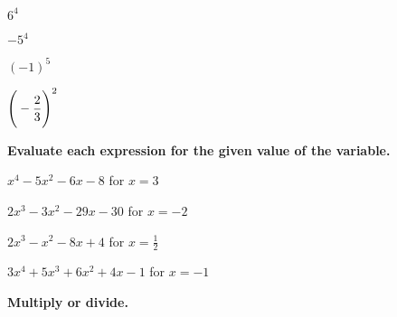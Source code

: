 \documentclass{report}
\theoremstyle{definition}
\begin{document}
\begin{enumerate}
\setcounter{enumi}{5}
	\begin{minipage}[t]{0.225\linewidth}
	\item $6^4$
	\end{minipage}
	\begin{minipage}[t]{0.225\linewidth}
	\item $-5^4$
	\end{minipage}
	\begin{minipage}[t]{0.225\linewidth}
	\item $(-1)^5$
	\end{minipage}
	\begin{minipage}[t]{0.225\linewidth}
	\item $\displaystyle\Bigg{(}-\frac{2}{3}\Bigg{)}^2$
	\end{minipage}
\end{enumerate}

\noindent \textbf{Evaluate each expression for the given value of the variable.}\\

\begin{enumerate}
\setcounter{enumi}{9}
	\begin{minipage}[t]{0.45\linewidth}
		\item $x^4-5x^2-6x-8$ for $x=3$
			\vspace{1cm}
		\item $2x^3-3x^2-29x-30$ for $x=-2$
			\vspace{1cm}
	\end{minipage}
	\begin{minipage}[t]{0.45\linewidth}
		\item $2x^3-x^2-8x+4$ for $x=\displaystyle\frac{1}{2}$
			\vspace{1cm}
		\item $3x^4+5x^3+6x^2+4x-1$ for $x=-1$
			\vspace{1cm}
	\end{minipage}
\end{enumerate}

\noindent \textbf{Multiply or divide.}\\
\end{document}
